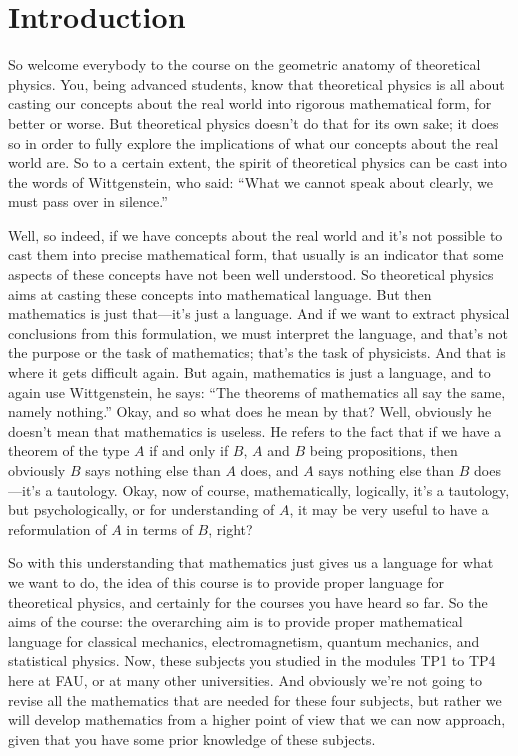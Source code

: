 \section{Introduction}

So welcome everybody to the course on the geometric anatomy of theoretical physics. You, being advanced students, know that theoretical physics is all about casting our concepts about the real world into rigorous mathematical form, for better or worse. But theoretical physics doesn't do that for its own sake; it does so in order to fully explore the implications of what our concepts about the real world are. So to a certain extent, the spirit of theoretical physics can be cast into the words of Wittgenstein, who said: ``What we cannot speak about clearly, we must pass over in silence.''

Well, so indeed, if we have concepts about the real world and it's not possible to cast them into precise mathematical form, that usually is an indicator that some aspects of these concepts have not been well understood. So theoretical physics aims at casting these concepts into mathematical language. But then mathematics is just that---it's just a language. And if we want to extract physical conclusions from this formulation, we must interpret the language, and that's not the purpose or the task of mathematics; that's the task of physicists. And that is where it gets difficult again. But again, mathematics is just a language, and to again use Wittgenstein, he says: ``The theorems of mathematics all say the same, namely nothing.'' Okay, and so what does he mean by that? Well, obviously he doesn't mean that mathematics is useless. He refers to the fact that if we have a theorem of the type $A$ if and only if $B$, $A$ and $B$ being propositions, then obviously $B$ says nothing else than $A$ does, and $A$ says nothing else than $B$ does---it's a tautology. Okay, now of course, mathematically, logically, it's a tautology, but psychologically, or for understanding of $A$, it may be very useful to have a reformulation of $A$ in terms of $B$, right?

So with this understanding that mathematics just gives us a language for what we want to do, the idea of this course is to provide proper language for theoretical physics, and certainly for the courses you have heard so far. So the aims of the course: the overarching aim is to provide proper mathematical language for classical mechanics, electromagnetism, quantum mechanics, and statistical physics. Now, these subjects you studied in the modules TP1 to TP4 here at FAU, or at many other universities. And obviously we're not going to revise all the mathematics that are needed for these four subjects, but rather we will develop mathematics from a higher point of view that we can now approach, given that you have some prior knowledge of these subjects.

